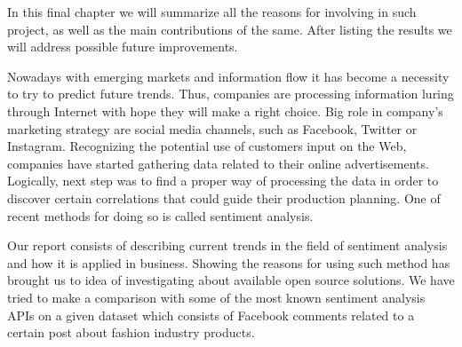 In this final chapter we will summarize all the reasons for involving in such project, as well as the main contributions of the same. After listing the results we will address possible future improvements.

Nowadays with emerging markets and information flow it has become a necessity to try to predict future trends. Thus, companies are processing information luring through Internet with hope they will make a right choice. Big role in company's marketing strategy are social media channels, such as Facebook, Twitter or Instagram. Recognizing the potential use of customers input on the Web, companies have started gathering data related to their online advertisements. Logically, next step was to find a proper way of processing the data in order to discover certain correlations that could guide their production planning. One of recent methods for doing so is called sentiment analysis.

Our report consists of describing current trends in the field of sentiment analysis and how it is applied in business. Showing the reasons for using such method has brought us to idea of investigating about available open source solutions. We have tried to make a comparison with some of the most known sentiment analysis APIs on a given dataset which consists of Facebook comments related to a certain post about fashion industry products. 
